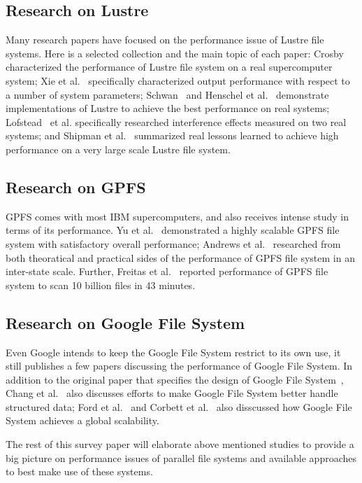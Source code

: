 

\subsection{Research on Lustre}
Many research papers have focused on the performance issue of 
Lustre file systems. 
%
Here is a selected collection and the main topic of each paper:
Crosby~\cite{Crosby2009} characterized the performance of Lustre file system
on a real supercomputer system;
%
Xie et al.~\cite{Xie2012} specifically characterized output performance
with respect to a number of system parameters;
%
Schwan~\cite{Schwan2003} and Henschel et al.~\cite{Henschel2012} 
demonstrate implementations of Lustre to achieve the best performance
on real systems; 
%
Lofstead~\cite{lofstead2010managing} et al. specifically researched interference effects
measured on two real systems; and
%
Shipman et al.~\cite{Shipman2010} summarized real lessons learned 
to achieve high performance on a very large scale Lustre file system.


\subsection{Research on GPFS}
GPFS comes with most IBM supercomputers, and also receives intense study
in terms of its performance.
%
Yu et al.~\cite{Yu2006} demonstrated a highly scalable GPFS file system
with satisfactory overall performance;
%
Andrews et al.~\cite{Andrews2005} researched from both theoratical 
and practical sides of the performance of GPFS file system
in an inter-state scale.
%
Further, Freitas et al.~\cite{freitas2011gpfs} reported performance 
of GPFS file system to scan 10 billion files in 43 minutes. 


\subsection{Research on Google File System}
Even Google intends to keep the Google File System restrict
to its own use, it still publishes a few papers discussing the 
performance of Google File System.
%
In addition to the original paper that specifies the design of
Google File System~\cite{ghemawat2003google},
Chang et al.~\cite{Chang2006a} also discusses efforts to make Google
File System better handle structured data;
Ford et al.~\cite{Ford2010a} and Corbett et al.~\cite{Corbett2012a}
also disscussed how Google File System achieves a global scalability.


The rest of this survey paper will elaborate above mentioned studies 
to provide a big picture on performance issues of parallel file systems
and available approaches to best make use of these systems.
